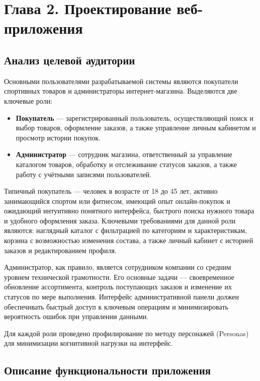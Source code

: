 
\section*{Глава 2. Проектирование веб-приложения}


\subsection{Анализ целевой аудитории}

Основными пользователями разрабатываемой системы являются покупатели спортивных
товаров и администраторы интернет-магазина. Выделяются две ключевые роли:

\begin{itemize}
    \item \textbf{Покупатель} --- зарегистрированный пользователь, осуществляющий
          поиск и выбор товаров, оформление заказов, а также управление личным
          кабинетом и просмотр истории покупок.
    \item \textbf{Администратор} --- сотрудник магазина, ответственный за
          управление каталогом товаров, обработку и отслеживание статусов
          заказов, а также работу с учётными записями пользователей.
\end{itemize}

Типичный покупатель --- человек в возрасте от 18 до 45 лет, активно занимающийся
спортом или фитнесом, имеющий опыт онлайн-покупок и ожидающий интуитивно
понятного интерфейса, быстрого поиска нужного товара и удобного оформления
заказа. Ключевыми требованиями для данной роли являются: наглядный каталог с
фильтрацией по категориям и характеристикам, корзина с возможностью изменения
состава, а также личный кабинет с историей заказов и редактированием профиля.

Администратор, как правило, является сотрудником компании со средним уровнем
технической грамотности. Его основные задачи --- своевременное обновление
ассортимента, контроль поступающих заказов и изменение их статусов по мере
выполнения. Интерфейс административной панели должен обеспечивать быстрый
доступ к ключевым операциям и минимизировать вероятность ошибок при управлении
данными.

Для каждой роли проведено профилирование по методу персонажей (Personas) для
минимизации когнитивной нагрузки на интерфейс.


\subsection{Описание функциональности приложения}

